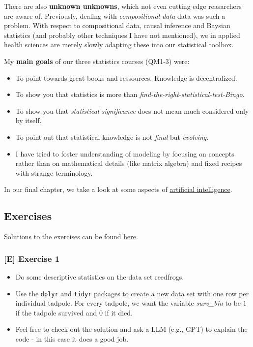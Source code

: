 \documentclass[
]{article}
\providecommand{\tightlist}{%
  \setlength{\itemsep}{0pt}\setlength{\parskip}{0pt}}
\begin{document}
There are also \textbf{unknown unknowns}, which not even cutting edge
reasarchers are aware of. Previously, dealing with \emph{compositional
data} data was such a problem. With respect to compositional data,
causal inference and Baysian statistics (and probably other techniques I
have not mentioned), we in applied health sciences are merely slowly
adapting these into our statistical toolbox.

My \textbf{main goals} of our three statistics courses (QM1-3) were:

\begin{itemize}
\tightlist
\item
  To point towards great books and ressources. Knowledge is
  decentralized.
\item
  To show you that statistics is more than
  \emph{find-the-right-statistical-test-Bingo}.
\item
  To show you that \emph{statistical significance} does not mean much
  considered only by itself.
\item
  To point out that statistical knowledge is not \emph{final} but
  \emph{evolving}.
\item
  I have tried to foster understanding of modeling by focusing on
  concepts rather than on mathematical details (like matrix algebra) and
  fixed recipes with strange terminology.
\end{itemize}

In our final chapter, we take a look at some aspects of
\href{https://en.wikipedia.org/wiki/Artificial_intelligence}{artificial
intelligence}.

\subsection{Exercises}\label{exercises}

Solutions to the exercises can be found
\href{https://github.com/jdegenfellner/Script_QM3_ZHAW/tree/main/Solutions_Exercises}{here}.

\subsubsection{{[}E{]} Exercise 1}\label{exercise1_LMM}

\begin{itemize}
\tightlist
\item
  Do some descriptive statistics on the data set reedfrogs.
\item
  Use the \texttt{dplyr} and \texttt{tidyr} packages to create a new
  data set with one row per individual tadpole. For every tadpole, we
  want the variable \emph{surv\_bin} to be \(1\) if the tadpole survived
  and \(0\) if it died.
\item
  Feel free to check out the solution and ask a LLM (e.g., GPT) to
  explain the code - in this case it does a good job.
\end{itemize}
\end{document}
